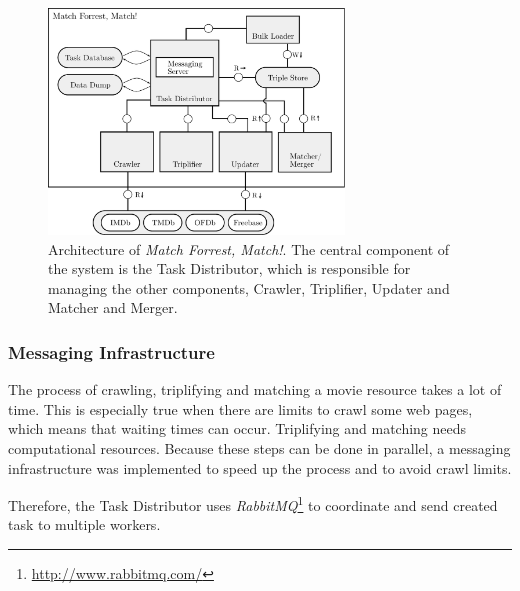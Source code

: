 \begin{figure}[ht]
  \begin{center}
  \includegraphics[width=0.7\textwidth]{images/architecture.pdf}
  \end{center}
  \caption{Architecture of \emph{Match Forrest, Match!}. The central component of the system is the Task Distributor, which is responsible for managing the other components, Crawler, Triplifier, Updater and Matcher and Merger.}
  \label{fig_architecture}
\end{figure}

\subsubsection{Messaging Infrastructure}
\label{subsubsec_messaging_infrastructure}

The process of crawling, triplifying and matching a movie resource takes a lot of time.
This is especially true when there are limits to crawl some web pages, which means that waiting times can occur.
Triplifying and matching needs computational resources.
Because these steps can be done in parallel, a messaging infrastructure was implemented to speed up the process and to avoid crawl limits.

Therefore, the Task Distributor uses \emph{RabbitMQ}\footnote{\url{http://www.rabbitmq.com/}} to coordinate and send created task to multiple workers.

